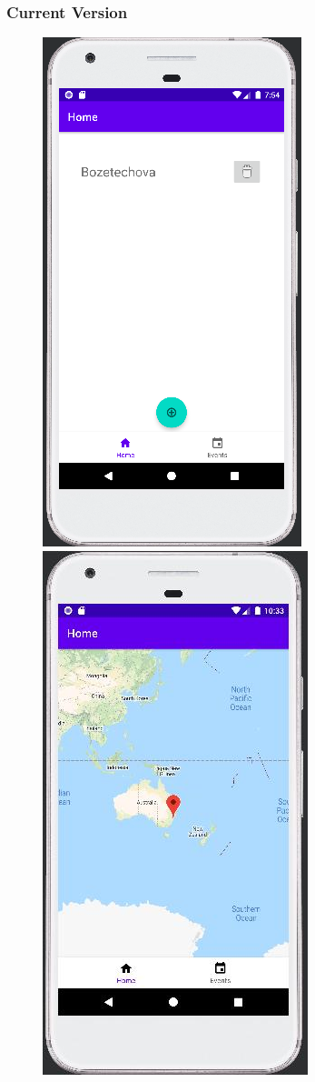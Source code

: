 \documentclass[10pt,xcolor=pdflatex,hyperref={unicode}]{beamer}
\begin{document}
\begin{frame}\frametitle{Current Version}
    \begin{figure}
        \centering
        \begin{minipage}{0.3\textwidth}
            \centering
            \includegraphics[width=0.25\paperwidth]{img/ui1.jpg}
        \end{minipage}
        \hfill
        \begin{minipage}{0.3\textwidth}
            \centering
            \includegraphics[width=0.25\paperwidth]{img/ui2.jpg}

\end{minipage}
\end{figure}
\end{frame}
\end{document}
